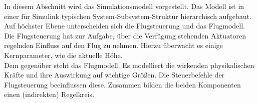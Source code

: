 In diesem Abschnitt wird das Simulationsmodell vorgestellt. Das Modell ist in einer für Simulink typischen System-Subsystem-Struktur hierarchisch aufgebaut. Auf höchster Ebene unterscheiden sich die Flugsteuerung und das Flugmodell. Die Flugsteuerung hat zur Aufgabe, über die Verfügung stehenden Aktuatoren regelnden Einfluss auf den Flug zu nehmen. Hierzu überwacht es einige Kernparameter, wie die aktuelle Höhe.\\

Dem gegenüber steht das Flugmodell. Es modelliert die wirkenden physikalischen Kräfte und ihre Auswirkung auf wichtige Größen. Die Steuerbefehle der Flugsteuerung beeinflussen diese. Zusammen bilden die beiden Komponenten einen (indirekten) Regelkreis.